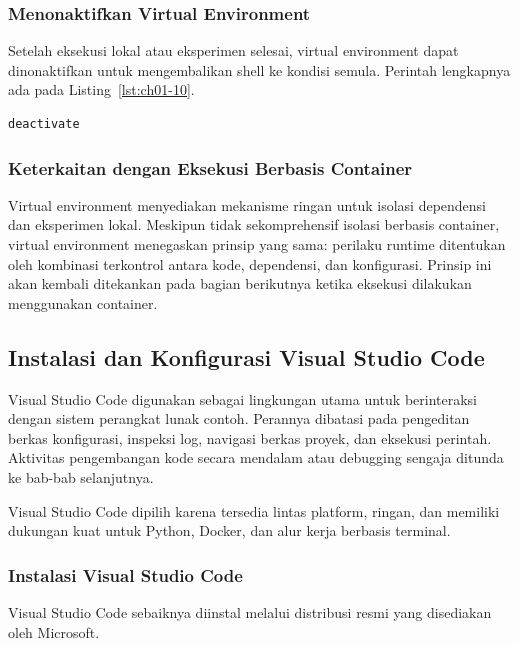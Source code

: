 \subsubsection{Menonaktifkan Virtual Environment}

Setelah eksekusi lokal atau eksperimen selesai, virtual environment dapat
dinonaktifkan untuk mengembalikan shell ke kondisi semula. Perintah lengkapnya ada pada Listing~\ref{lst:ch01-10}.

\begin{lstlisting}[language=bash, caption={Mengaktifkan virtual environment (2)}, label={lst:ch01-10}]
deactivate
\end{lstlisting}

\subsubsection{Keterkaitan dengan Eksekusi Berbasis Container}

Virtual environment menyediakan mekanisme ringan untuk isolasi dependensi dan
eksperimen lokal. Meskipun tidak sekomprehensif isolasi berbasis container,
virtual environment menegaskan prinsip yang sama: perilaku runtime ditentukan
oleh kombinasi terkontrol antara kode, dependensi, dan konfigurasi. Prinsip ini
akan kembali ditekankan pada bagian berikutnya ketika eksekusi dilakukan
menggunakan container.

\subsection{Instalasi dan Konfigurasi Visual Studio Code}

Visual Studio Code digunakan sebagai lingkungan utama untuk berinteraksi dengan
sistem perangkat lunak contoh. Perannya dibatasi pada pengeditan berkas
konfigurasi, inspeksi log, navigasi berkas proyek, dan eksekusi perintah. Aktivitas
pengembangan kode secara mendalam atau debugging sengaja ditunda ke bab-bab
selanjutnya.

Visual Studio Code dipilih karena tersedia lintas platform, ringan, dan memiliki
dukungan kuat untuk Python, Docker, dan alur kerja berbasis terminal.

\subsubsection{Instalasi Visual Studio Code}

Visual Studio Code sebaiknya diinstal melalui distribusi resmi yang disediakan
oleh Microsoft.

